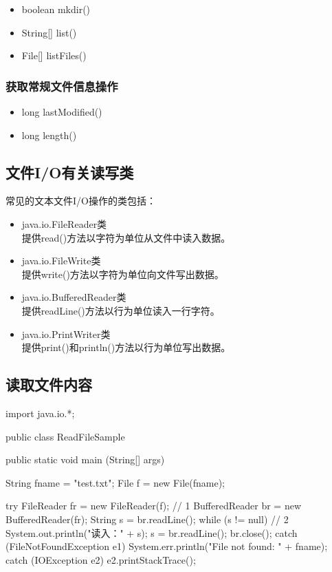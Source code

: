 \begin{itemize}
\item boolean mkdir() 
\item String[] list() 
\item File[] listFiles()
\end{itemize}

\subsubsection{获取常规文件信息操作}

\begin{itemize}
\item long lastModified() 
\item long length()
\end{itemize}


\subsection{文件I/O有关读写类}

常见的文本文件I/O操作的类包括：
\begin{itemize}
\item java.io.FileReader类\\
  提供read()方法以字符为单位从文件中读入数据。
\item java.io.FileWrite类\\
  提供write()方法以字符为单位向文件写出数据。
\item java.io.BufferedReader类\\
  提供readLine()方法以行为单位读入一行字符。
\item java.io.PrintWriter类\\
  提供print()和println()方法以行为单位写出数据。
\end{itemize}


\subsection{读取文件内容}


\begin{javaCode}
  import java.io.*;

  public class ReadFileSample {
    public static void main (String[] args) {
      String fname = "test.txt"; 
      File f = new File(fname);

      try {
        FileReader fr = new FileReader(f);  // 1
        BufferedReader br = new BufferedReader(fr); 
        String s = br.readLine();
        while (s != null) { // 2
          System.out.println("读入：" + s);
          s = br.readLine(); }
        br.close();
      } catch (FileNotFoundException e1) {
        System.err.println("File not found: " + fname); 
      } catch (IOException e2) {
        e2.printStackTrace(); 
      }
    } 
  }
\end{javaCode}

